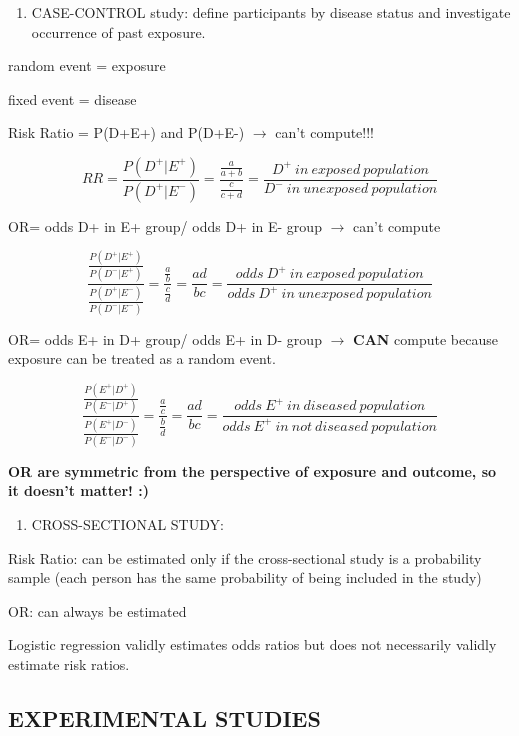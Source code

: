 \documentclass[
]{article}
\providecommand{\tightlist}{%
  \setlength{\itemsep}{0pt}\setlength{\parskip}{0pt}}
\begin{document}
\begin{enumerate}
\def\labelenumi{\arabic{enumi}.}
\setcounter{enumi}{1}
\tightlist
\item
  CASE-CONTROL study: define participants by disease status and
  investigate occurrence of past exposure.
\end{enumerate}

random event = exposure

fixed event = disease

Risk Ratio = P(D+\textbar E+) and P(D+\textbar E-) \(\to\) can't
compute!!!

\[RR= \frac{P(D^+|E^+)}{P(D^+|E^-)}=\frac{\frac{a}{a+b}}{\frac{c}{c+d}}=\frac{D^+\:in\:exposed\:population}{D^-\:in\:unexposed\:population}\]

OR= odds D+ in E+ group/ odds D+ in E- group \(\to\) can't compute

\[\frac{\frac{P(D^+|E^+)}{P(D^-|E^+)}}{\frac{P(D^+|E^-)}{P(D^-|E^-)}}=\frac{\frac{a}{b}}{\frac{c}{d}}=\frac{ad}{bc}=\frac{odds\:D^+\:in\:exposed\:population}{odds\:D^+\:in\:unexposed\:population}\]

OR= odds E+ in D+ group/ odds E+ in D- group \(\to\) \textbf{CAN}
compute because exposure can be treated as a random event.

\[\frac{\frac{P(E^+|D^+)}{P(E^-|D^+)}}{\frac{P(E^+|D^-)}{P(E^-|D^-)}}=\frac{\frac{a}{c}}{\frac{b}{d}}=\frac{ad}{bc}=\frac{odds\:E^+\:in\:diseased\:population}{odds\:E^+\:in\:not\:diseased\:population}\]

\textbf{OR are symmetric from the perspective of exposure and outcome,
so it doesn't matter! :) }

\begin{enumerate}
\def\labelenumi{\arabic{enumi}.}
\setcounter{enumi}{2}
\tightlist
\item
  CROSS-SECTIONAL STUDY:
\end{enumerate}

Risk Ratio: can be estimated only if the cross-sectional study is a
probability sample (each person has the same probability of being
included in the study)

OR: can always be estimated

Logistic regression validly estimates odds ratios but does not
necessarily validly estimate risk ratios.

\hypertarget{experimental-studies}{%
\subsection{EXPERIMENTAL STUDIES}\label{experimental-studies}}
\end{document}
